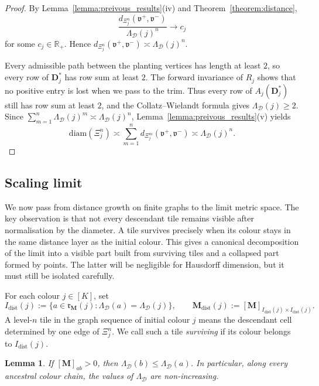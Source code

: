 \documentclass[12pt]{iopart}
\newtheorem{lemma}[theorem]{Lemma}
\newcommand*{\dist}{d}
\newcommand*{\diam}{\mathrm{diam}}
\begin{document}
\begin{proof}
By Lemma~\ref{lemma:preivous_results}(iv) and Theorem~\ref{theorem:distance},
\[
\frac{\dist_{\Xi_j^n}(\mathfrak v^+,\mathfrak v^-)}{\Lambda_{\mathcal D}(j)^n}
\to c_j
\]
for some $c_j\in\mathbb R_+$.
Hence $\dist_{\Xi_j^n}(\mathfrak v^+,\mathfrak v^-)\asymp \Lambda_{\mathcal D}(j)^n$.

Every admissible path between the planting vertices has length at least $2$, so every row of $\mathbf D_j^*$ has row sum at least $2$.
The forward invariance of $R_j$ shows that no positive entry is lost when we pass to the trim.
Thus every row of $A_j(\mathbf D_j^*)$ still has row sum at least $2$, and the Collatz--Wielandt formula gives
$\Lambda_{\mathcal D}(j)\ge 2$.
Since $\sum_{m=1}^n \Lambda_{\mathcal D}(j)^m\asymp \Lambda_{\mathcal D}(j)^n$, Lemma~\ref{lemma:preivous_results}(v) yields
\[
\diam(\Xi_j^n)
\asymp
\sum_{m=1}^n \dist_{\Xi_j^m}(\mathfrak v^+,\mathfrak v^-)
\asymp
\Lambda_{\mathcal D}(j)^n.
\]
\end{proof}

\subsection{Scaling limit}

We now pass from distance growth on finite graphs to the limit metric space.
The key observation is that not every descendant tile remains visible after normalisation by the diameter.
A tile survives precisely when its colour stays in the same distance layer as the initial colour.
This gives a canonical decomposition of the limit into a visible part built from surviving tiles and a collapsed part formed by points.
The latter will be negligible for Hausdorff dimension, but it must still be isolated carefully.

For each colour $j\in[K]$, set
\[
I_{\mathrm{dist}}(j)
:=
\big\{
a\in\mathfrak r_{\mathbf M}(j):
\Lambda_{\mathcal D}(a)=\Lambda_{\mathcal D}(j)
\big\},
\qquad
\mathbf M_{\mathrm{dist}}(j)
:=
[\mathbf M]_{I_{\mathrm{dist}}(j)\times I_{\mathrm{dist}}(j)}.
\]
A level-$n$ tile in the graph sequence of initial colour $j$ means the descendant cell determined by one edge of $\Xi_j^n$.
We call such a tile \emph{surviving} if its colour belongs to $I_{\mathrm{dist}}(j)$.

\begin{lemma}\label{lem:distance-monotone}
If $[\mathbf M]_{ab}>0$, then $\Lambda_{\mathcal D}(b)\le \Lambda_{\mathcal D}(a)$.
In particular, along every ancestral colour chain, the values of $\Lambda_{\mathcal D}$ are non-increasing.
\end{lemma}
\end{document}
